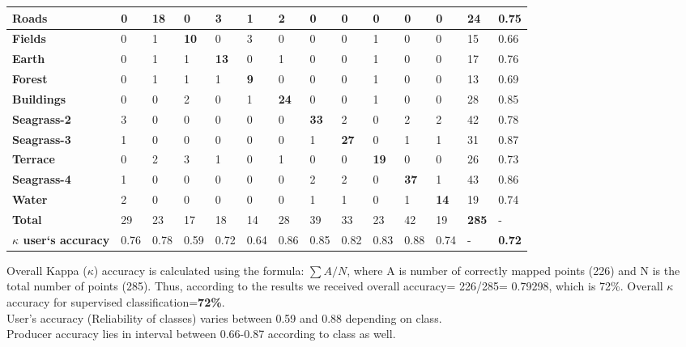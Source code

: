 \documentclass[11pt]{article}
\begin{document}
\begin{appendices}
\begin{table}[H]
\begin{tabular}{| p{1.7cm} | p{0.7cm}| p{0.7cm}|p{0.7cm}|p{0.7cm}|p{0.7cm}|p{0.7cm}|p{0.7cm}|p{0.7cm}|p{0.7cm}|p{0.7cm}|p{0.7cm}|| p{0.7cm}||p{0.7cm}|}
		\textbf{Roads} & 0 & \cellcolor{LightSkyBlue}\textbf{18} & 0 & 3 & 1 & 2 & 0& 0 & 0 & 0 & 0 & \cellcolor{LightBlue}24 & 0.75 \\ \hline
		\textbf{Fields} & 0 & 1 & \cellcolor{LightSkyBlue}\textbf{10} & 0 & 3 & 0 & 0 & 0 & 1 & 0 & 0 & \cellcolor{LightBlue}15 & 0.66 \\ \hline
             	\textbf{Earth} & 0 & 1 & 1 & \cellcolor{LightSkyBlue}\textbf{13} & 0 & 1 & 0 & 0 & 1 & 0 & 0 & \cellcolor{LightBlue}17 & 0.76 \\ \hline
		\textbf{Forest} & 0 & 1 & 1 & 1 & \cellcolor{LightSkyBlue}\textbf{9} & 0 & 0 & 0 & 1 & 0 & 0 & \cellcolor{LightBlue}13 & 0.69 \\ \hline
		\textbf{Buildings} & 0 & 0 & 2 & 0 & 1 & \cellcolor{LightSkyBlue}\textbf{24} & 0 & 0 & 1 & 0 & 0 & \cellcolor{LightBlue}28 & 0.85 \\ \hline
		\textbf{Seagrass-2} & 3 & 0 & 0 & 0 & 0 & 0 & \cellcolor{LightSkyBlue}\textbf{33} & 2 & 0 & 2 & 2 & \cellcolor{LightBlue}42 & 0.78 \\ \hline
		\textbf{Seagrass-3} & 1 & 0 & 0 & 0 & 0 & 0 & 1 & \cellcolor{LightSkyBlue}\textbf{27} & 0 & 1 & 1 & \cellcolor{LightBlue}31 & 0.87 \\ \hline
		\textbf{Terrace} & 0 & 2 & 3 & 1 & 0 & 1 & 0 & 0 & \cellcolor{LightSkyBlue}\textbf{19} & 0 & 0 & \cellcolor{LightBlue}26 & 0.73 \\ \hline
		\textbf{Seagrass-4} & 1 & 0 & 0 & 0 & 0 & 0 & 2 & 2 & 0 & \cellcolor{LightSkyBlue}\textbf{37} & 1 & \cellcolor{LightBlue}43 & 0.86 \\ \hline
		\textbf{Water} & 2 & 0 & 0 & 0 & 0 & 0 & 1 & 1 & 0 & 1 & \cellcolor{LightSkyBlue}\textbf{14} & \cellcolor{LightBlue}19 & 0.74 \\ \hline\hline
		\rowcolor{LightBlue}\textbf{Total} & 29 & 23 & 17 & 18 & 14 & 28 & 39 & 33 & 23 & 42 & \cellcolor{LightBlue}19 & \textbf{285} & - \\ \hline
		\textbf{$\kappa$ user`s accuracy} & 0.76 & 0.78 & 0.59 & 0.72 & 0.64 & 0.86 & 0.85 & 0.82 & 0.83 & 0.88 & 0.74 & - & \cellcolor{MediumTurquoise}\textbf{0.72} \\ \hline
	\end{tabular}	
\end{table}
\normalsize
Overall Kappa ($\kappa$) accuracy is calculated using the formula:  $\sum{A/N}$, where A is number of correctly mapped points (226) and N is the total number of points (285). Thus, according to the results we received overall accuracy= 226/285= 0.79298, which is 72\%.  Overall $\kappa$ accuracy for supervised classification=\textbf{72\%}. \\  User’s accuracy (Reliability of classes) varies between 0.59 and 0.88 depending on class. \\ 
Producer accuracy lies in interval between 0.66-0.87 according to class as well. 


\end{appendices}
\end{document}

